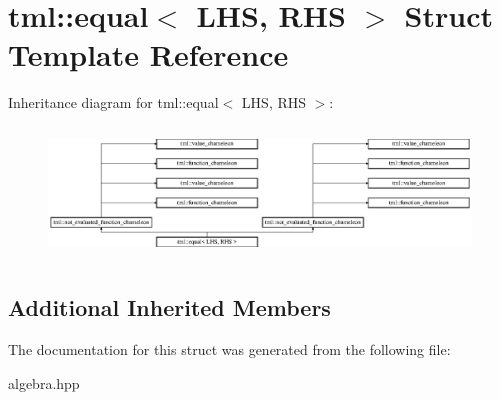 \hypertarget{structtml_1_1equal}{\section{tml\+:\+:equal$<$ L\+H\+S, R\+H\+S $>$ Struct Template Reference}
\label{structtml_1_1equal}
}
Inheritance diagram for tml\+:\+:equal$<$ L\+H\+S, R\+H\+S $>$\+:\begin{figure}[H]
\begin{center}
\leavevmode
\includegraphics[height=3.500000cm]{structtml_1_1equal}
\end{center}
\end{figure}
\subsection*{Additional Inherited Members}


The documentation for this struct was generated from the following file\+:\begin{DoxyCompactItemize}
\item 
algebra.\+hpp\end{DoxyCompactItemize}
